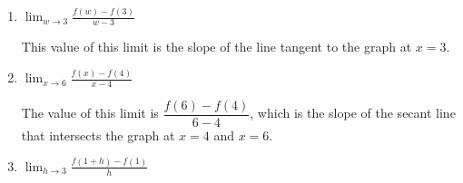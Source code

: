 \documentclass{article}
\begin{document}
\begin{enumerate}[resume]
\begin{enumerate}
  \item
    \begin{problem}[\vfill]
      $\displaystyle \lim_{w \to 3} \frac{f(w) - f(3)}{w - 3}$
    \end{problem}

    \begin{solution}
    This value of this limit is the slope of the line tangent to the graph at $x=3$. 
      \begin{center}
      \end{center}
    \end{solution}

  \item
    \begin{problem}[\vfill]
      $\displaystyle \lim_{x \to 6} \frac{f(x) - f(4)}{x - 4}$
    \end{problem}

    \begin{solution}
    The value of this limit is $\dfrac{f(6)-f(4)}{6-4}$, which is the slope of the secant line
    that intersects the graph at $x=4$ and $x=6$.
      \begin{center}
      \end{center}
    \end{solution}

  \item
    \begin{problem}[\vfill]
      $\displaystyle \lim_{h \to 3} \frac{f(1 + h) - f(1)}{h}$
    \end{problem}


\end{enumerate}
\end{enumerate}
\end{document}
